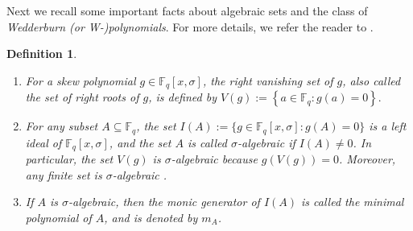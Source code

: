 \documentclass[12pt,paper]{article}
\theoremstyle{plain}
\newtheorem{definition}[theorem]{Definition}
\newcommand{\Fq}{\mathbb{F}_{q}}
\begin{document}

 

\vspace{0.5cm}

Next we recall some important facts about algebraic sets and the class of \emph{Wedderburn (\textnormal{or} W-)polynomials}. For more details, we refer the reader to \cite{Leroy2004, Leroy2008}. 

\begin{definition}
\begin{enumerate}
    \item 
    For a skew polynomial $g \in \mathbb{F}_q[x, \sigma]$, the \emph{right vanishing set} of $g$, also called the \emph{set of right roots} of $g$, is defined by  
$
V(g) := \left\{ a \in \mathbb{F}_q : g(a) = 0 \right\}.
$
\item
For any subset $A \subseteq \mathbb{F}_q$, the set $I(A) := \{ g \in \mathbb{F}_q[x, \sigma] : g(A) = 0 \}$ is a left ideal of $\mathbb{F}_q[x, \sigma]$, and the set $A$ is called \emph{$\sigma$-algebraic} if $I(A) \neq 0$. In particular, the set $V(g)$ is $\sigma$-algebraic because $g(V(g)) = 0$. Moreover, any finite set is $\sigma$-algebraic \cite[Section 6]{Lam2000}.
\item If $A$ is $\sigma$-algebraic, then the monic generator of $I(A)$ is called the \emph{minimal polynomial} of $A$, and is denoted by $m_A$. 
\end{enumerate}
\end{definition}
\end{document}

